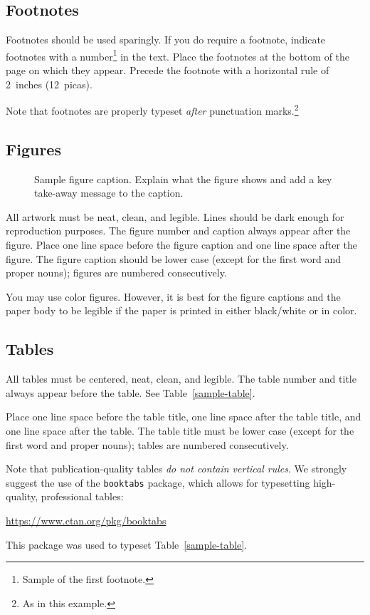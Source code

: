 \documentclass{article}
\begin{document}
\subsection{Footnotes}


Footnotes should be used sparingly.  If you do require a footnote, indicate
footnotes with a number\footnote{Sample of the first footnote.} in the
text. Place the footnotes at the bottom of the page on which they appear.
Precede the footnote with a horizontal rule of 2~inches (12~picas).


Note that footnotes are properly typeset \emph{after} punctuation
marks.\footnote{As in this example.}


\subsection{Figures}


\begin{figure}
  \centering
  \fbox{\rule[-.5cm]{0cm}{4cm} \rule[-.5cm]{4cm}{0cm}}
  \caption{Sample figure caption. Explain what the figure shows and add a key take-away message to the caption.}
\end{figure}


All artwork must be neat, clean, and legible. Lines should be dark enough for
reproduction purposes. The figure number and caption always appear after the
figure. Place one line space before the figure caption and one line space after
the figure. The figure caption should be lower case (except for the first word and proper nouns); figures are numbered consecutively.


You may use color figures.  However, it is best for the figure captions and the
paper body to be legible if the paper is printed in either black/white or in
color.


\subsection{Tables}


All tables must be centered, neat, clean, and legible.  The table number and
title always appear before the table.  See Table~\ref{sample-table}.


Place one line space before the table title, one line space after the
table title, and one line space after the table. The table title must
be lower case (except for the first word and proper nouns); tables are
numbered consecutively.


Note that publication-quality tables \emph{do not contain vertical rules}. We
strongly suggest the use of the \verb+booktabs+ package, which allows for
typesetting high-quality, professional tables:
\begin{center}
  \url{https://www.ctan.org/pkg/booktabs}
\end{center}
This package was used to typeset Table~\ref{sample-table}.
\end{document}
